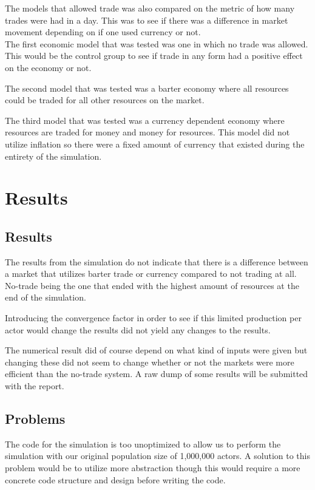 \documentclass[11p]{article}
\begin{document}
The models that allowed trade was also compared on the metric of how many trades were had in a day. This was to see if there was a difference in market movement depending on if one used currency or not.
\\

The first economic model that was tested was one in which no trade was allowed. This would be the control group to see if trade in any form had a positive effect on the economy or not.

The second model that was tested was a barter economy where all resources could be traded for all other resources on the market.

The third model that was tested was a currency dependent economy where resources are traded for money and money for resources. This model did not utilize inflation so there were a fixed amount of currency that existed during the entirety of the simulation.


\section{Results}

\subsection{Results}
The results from the simulation do not indicate that there is a difference between a market that utilizes barter trade or currency compared to not trading at all. No-trade being the one that ended with the highest amount of resources at the end of the simulation.

Introducing the convergence factor in order to see if this limited production per actor would change the results did not yield any changes to the results. 

The numerical result did of course depend on what kind of inputs were given but changing these did not seem to change whether or not the markets were more efficient than the no-trade system. A raw dump of some results will be submitted with the report. 
\subsection{Problems}
The code for the simulation is too unoptimized to allow us to perform the simulation with our original population size of 1,000,000 actors. A solution to this problem would be to utilize more abstraction though this would require a more concrete code structure and design before writing the code. 
\\
\end{document}
